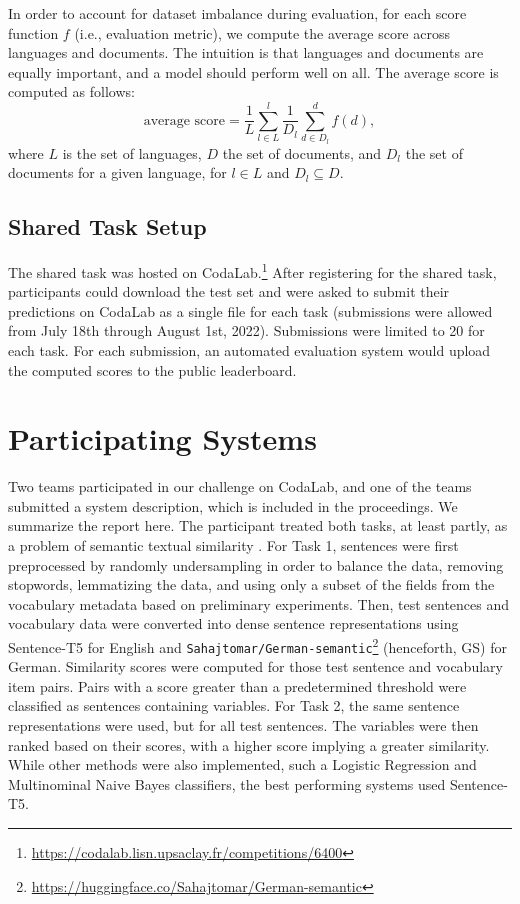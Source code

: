 \documentclass[11pt]{article}
\begin{document}
In order to account for dataset imbalance during evaluation, for each score function $f$ (i.e., evaluation metric), we compute the average score across languages and documents.
The intuition is that languages and documents are equally important, and a model should perform well on all.
The average score is computed as follows:
\begin{equation}
\label{eq:macro}
    \text{average score} = \frac{1}{L}\sum^l_{l \in L}\frac{1}{D_l}\sum^d_{d \in D_l}f(d),
\end{equation}
\noindent where $L$ is the set of languages, $D$ the set of documents, and $D_l$ the set of documents for a given language, for $l \in L$ and $D_l \subseteq D$.

\subsection{Shared Task Setup}
The shared task was hosted on CodaLab.\footnote{\url{https://codalab.lisn.upsaclay.fr/competitions/6400}}
After registering for the shared task, participants could download the test set and were asked to submit their predictions on CodaLab as a single file for each task (submissions were allowed from July 18th through August 1st, 2022).
Submissions were limited to 20 for each task.
For each submission, an automated evaluation system would upload the computed scores to the public leaderboard.


\section{Participating Systems}
\label{sec:participating-systems}
Two teams participated in our challenge on CodaLab, and one of the teams submitted a system description, which is included in the proceedings.
We summarize the report here.
The participant \citep{hoevelmeyer2022} treated both tasks, at least partly, as a problem of semantic textual similarity \citep{agirre-etal-2013-sem}.
For Task 1, sentences were first preprocessed by randomly undersampling in order to balance the data, removing stopwords, lemmatizing the data, and using only a subset of the fields from the vocabulary metadata based on preliminary experiments.
Then, test sentences and vocabulary data were converted into dense sentence representations using Sentence-T5 \citep{ni-etal-2022-sentence} for English and \texttt{Sahajtomar/German-semantic}\footnote{\url{https://huggingface.co/Sahajtomar/German-semantic}} (henceforth, GS) for German.
Similarity scores were computed for those test sentence and vocabulary item pairs.
Pairs with a score greater than a predetermined threshold were classified as sentences containing variables.
For Task 2, the same sentence representations were used, but for all test sentences.
The variables were then ranked based on their scores, with a higher score implying a greater similarity.
While other methods were also implemented, such a Logistic Regression and Multinominal Naive Bayes classifiers, the best performing systems used Sentence-T5.
\end{document}

